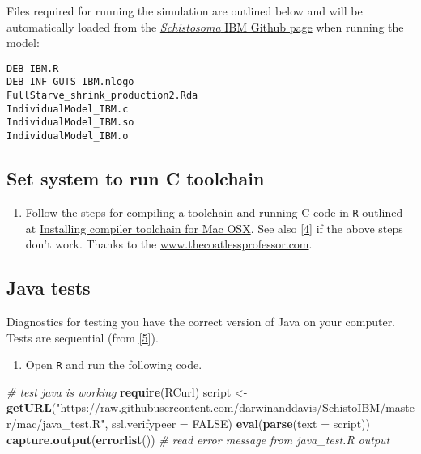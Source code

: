 \documentclass[10,portrait]{article}
\newenvironment{Shaded}{\begin{snugshade}}{\end{snugshade}}
\newcommand{\KeywordTok}[1]{\textcolor[rgb]{0.13,0.29,0.53}{\textbf{#1}}}
\newcommand{\DataTypeTok}[1]{\textcolor[rgb]{0.13,0.29,0.53}{#1}}
\newcommand{\StringTok}[1]{\textcolor[rgb]{0.31,0.60,0.02}{#1}}
\newcommand{\CommentTok}[1]{\textcolor[rgb]{0.56,0.35,0.01}{\textit{#1}}}
\newcommand{\OtherTok}[1]{\textcolor[rgb]{0.56,0.35,0.01}{#1}}
\newcommand{\NormalTok}[1]{#1}
\providecommand{\tightlist}{%
  \setlength{\itemsep}{0pt}\setlength{\parskip}{0pt}}
\begin{document}
Files required for running the simulation are outlined below and will be
automatically loaded from the
\href{https://github.com/darwinanddavis/SchistoIBM}{\emph{Schistosoma}
IBM Github page} when running the model:

\begin{verbatim}
DEB_IBM.R
DEB_INF_GUTS_IBM.nlogo
FullStarve_shrink_production2.Rda
IndividualModel_IBM.c
IndividualModel_IBM.so
IndividualModel_IBM.o
\end{verbatim}

\subsection{Set system to run C
toolchain}\label{set-system-to-run-c-toolchain}

\begin{enumerate}
\def\labelenumi{\arabic{enumi}.}
\tightlist
\item
  Follow the steps for compiling a toolchain and running C code in
  \texttt{R} outlined at
  \href{https://thecoatlessprofessor.com/programming/r-compiler-tools-for-rcpp-on-macos/}{Installing
  compiler toolchain for Mac OSX}. See also
  \protect\hyperlink{references}{{[}4{]}} if the above steps don't work.
  Thanks to the \url{www.thecoatlessprofessor.com}.
\end{enumerate}

\subsection{Java tests}\label{java-tests}

Diagnostics for testing you have the correct version of Java on your
computer. Tests are sequential (from
\protect\hyperlink{references}{{[}5{]}}).

\begin{enumerate}
\def\labelenumi{\arabic{enumi}.}
\tightlist
\item
  Open \texttt{R} and run the following code.
\end{enumerate}

\begin{Shaded}
\begin{Highlighting}[]
\CommentTok{# test java is working}
\KeywordTok{require}\NormalTok{(RCurl)}
\NormalTok{script <-}\StringTok{ }\KeywordTok{getURL}\NormalTok{(}\StringTok{"https://raw.githubusercontent.com/darwinanddavis/SchistoIBM/master/mac/java_test.R"}\NormalTok{, }\DataTypeTok{ssl.verifypeer =} \OtherTok{FALSE}\NormalTok{)}
\KeywordTok{eval}\NormalTok{(}\KeywordTok{parse}\NormalTok{(}\DataTypeTok{text =}\NormalTok{ script))}
\KeywordTok{capture.output}\NormalTok{(}\KeywordTok{errorlist}\NormalTok{()) }\CommentTok{# read error message from java_test.R output}
\end{Highlighting}
\end{Shaded}
\end{document}
